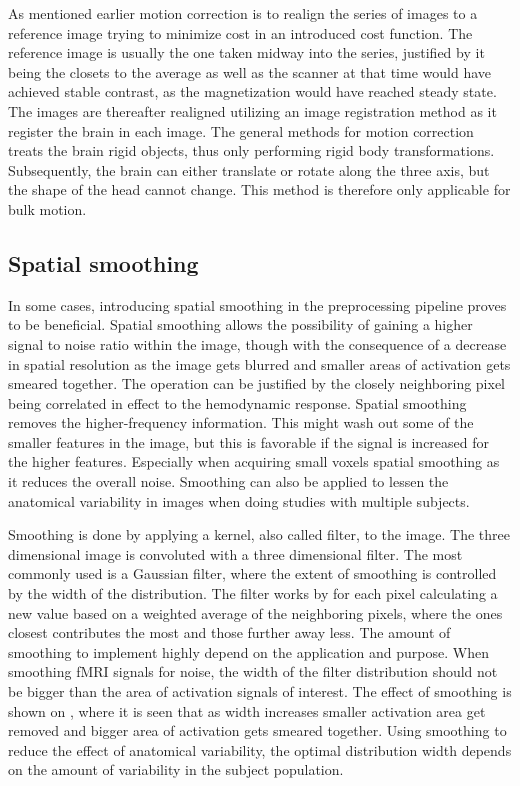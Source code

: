 As mentioned earlier motion correction is to realign the series of images to a reference image trying to minimize cost in an introduced cost function. The reference image is usually the one taken midway into the series, justified by it being the closets to the average as well as the scanner at that time would have achieved stable contrast, as the magnetization would have reached steady state. The images are thereafter realigned utilizing an image registration method as it register the brain in each image. The general methods for motion correction treats the brain rigid objects, thus only performing rigid body transformations. Subsequently, the brain can either translate or rotate along the three axis, but the shape of the head cannot change. This method is therefore only applicable for bulk motion.\cite{Poldrack2011} 

\subsection{Spatial smoothing}

In some cases, introducing spatial smoothing in the preprocessing pipeline proves to be beneficial. Spatial smoothing allows the possibility of gaining a higher signal to noise ratio within the image, though with the consequence of a decrease in spatial resolution as the image gets blurred and smaller areas of activation gets smeared together. The operation can be justified by the closely neighboring pixel being correlated in effect to the hemodynamic response. Spatial smoothing removes the higher-frequency information. This might wash out some of the smaller features in the image, but this is favorable if the signal is increased for the higher features. Especially when acquiring small voxels spatial smoothing as it reduces the overall noise. Smoothing can also be applied to lessen the anatomical variability in images when doing studies with multiple subjects.\cite{Poldrack2011}

Smoothing is done by applying a kernel, also called filter, to the image. The three dimensional image is convoluted with a three dimensional filter. The most commonly used is a Gaussian filter, where the extent of smoothing is controlled by the width of the distribution. The filter works by for each pixel calculating a new value based on a weighted average of the neighboring pixels, where the ones closest contributes the most and those further away less. The amount of smoothing to implement highly depend on the application and purpose. When smoothing fMRI signals for noise, the width of the filter distribution should not be bigger than the area of activation signals of interest. The effect of smoothing is shown on , where it is seen that as width increases smaller activation area get removed and bigger area of activation gets smeared together. 
Using smoothing to reduce the effect of anatomical variability, the optimal distribution width depends on the amount of variability in the subject population.\cite{Poldrack2011}
  

